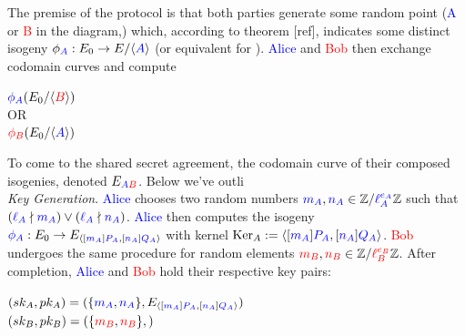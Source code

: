 \begin{center}
\end{center}

The premise of the protocol is that both parties generate some random point (\textcolor{blue}{A} or \textcolor{red}{B} in the diagram,) which, according to theorem [ref], indicates some distinct isogeny $\phi_{\textcolor{blue}{A}}: E_0 \rightarrow E/ \langle \textcolor{blue}{A} \rangle$ (or equivalent for \rb). \textcolor{blue}{Alice} and \textcolor{red}{Bob} then exchange codomain curves and compute
\begin{center}
$\textcolor{blue}{\phi_A}(E_0/\langle \textcolor{red}{B} \rangle)$\\
$\text{OR}$\\
$\textcolor{red}{\phi_B}(E_0/\langle \textcolor{blue}{A} \rangle)$
\end{center}
To come to the shared secret agreement, the codomain curve of their composed isogenies, denoted $E_{\textcolor{blue}{A}\textcolor{red}{B}}$. Below we've outli\\

\noindent
\textit{Key Generation}. \textcolor{blue}{Alice} chooses two random numbers $\textcolor{blue}{m_A}, \textcolor{blue}{n_A} \in \mathbb{Z}/\textcolor{blue}{\ell_{A}^{e_A}}\mathbb{Z}$ such that $(\textcolor{blue}{\ell_{A}} \nmid \textcolor{blue}{m_A}) \lor (\textcolor{blue}{\ell_{A}} \nmid \textcolor{blue}{n_A})$. \textcolor{blue}{Alice} then computes the isogeny $\textcolor{blue}{\phi_A}: E_0 \rightarrow E_{\langle [\textcolor{blue}{m_A}]\textcolor{blue}{P_A}, [\textcolor{blue}{n_A}]\textcolor{blue}{Q_A}\rangle}$ with kernel $\text{Ker}_A := \langle [\textcolor{blue}{m_A}]\textcolor{blue}{P_A}, [\textcolor{blue}{n_A}]\textcolor{blue}{Q_A}\rangle$. \textcolor{red}{Bob} undergoes the same procedure for random elements $\textcolor{red}{m_B}, \textcolor{red}{n_B} \in \mathbb{Z}/\textcolor{red}{\ell_{B}^{e_B}}\mathbb{Z}$. After completion, \textcolor{blue}{Alice} and \textcolor{red}{Bob} hold their respective key pairs:
\begin{center}
$(sk_A, pk_A) = (\{\textcolor{blue}{m_A},\textcolor{blue}{n_A}\}, E_{\langle [\textcolor{blue}{m_A}]\textcolor{blue}{P_A}, [\textcolor{blue}{n_A}]\textcolor{blue}{Q_A}\rangle})$\\
$(sk_B, pk_B) = (\{\textcolor{red}{m_B},\textcolor{red}{n_B}\}, )$
\end{center}


